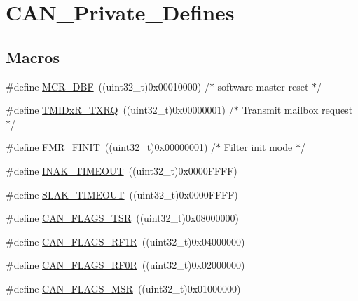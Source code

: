 \hypertarget{group___c_a_n___private___defines}{}\section{C\+A\+N\+\_\+\+Private\+\_\+\+Defines}
\label{group___c_a_n___private___defines}
\subsection*{Macros}
\begin{DoxyCompactItemize}
\item 
\#define \mbox{\hyperlink{group___c_a_n___private___defines_ga1ded3736beb63c49281f2983fc68c36d}{M\+C\+R\+\_\+\+D\+BF}}~((uint32\+\_\+t)0x00010000) /$\ast$ software master reset $\ast$/
\item 
\#define \mbox{\hyperlink{group___c_a_n___private___defines_gabeb6db5ba5c01da5084ec1605f868e18}{T\+M\+I\+Dx\+R\+\_\+\+T\+X\+RQ}}~((uint32\+\_\+t)0x00000001) /$\ast$ Transmit mailbox request $\ast$/
\item 
\#define \mbox{\hyperlink{group___c_a_n___private___defines_ga6125d0273c466e402db1a8f5bf888857}{F\+M\+R\+\_\+\+F\+I\+N\+IT}}~((uint32\+\_\+t)0x00000001) /$\ast$ Filter init mode $\ast$/
\item 
\#define \mbox{\hyperlink{group___c_a_n___private___defines_ga60a32132df242146efd3e9f7a079f0f0}{I\+N\+A\+K\+\_\+\+T\+I\+M\+E\+O\+UT}}~((uint32\+\_\+t)0x0000\+F\+F\+F\+F)
\item 
\#define \mbox{\hyperlink{group___c_a_n___private___defines_ga1bb8107706c8b4039ac55a122f3c65bb}{S\+L\+A\+K\+\_\+\+T\+I\+M\+E\+O\+UT}}~((uint32\+\_\+t)0x0000\+F\+F\+F\+F)
\item 
\#define \mbox{\hyperlink{group___c_a_n___private___defines_gac67e7d905ba11441bf9e14180805cf3a}{C\+A\+N\+\_\+\+F\+L\+A\+G\+S\+\_\+\+T\+SR}}~((uint32\+\_\+t)0x08000000)
\item 
\#define \mbox{\hyperlink{group___c_a_n___private___defines_ga2a03d73273ab353c8deb3a4730431977}{C\+A\+N\+\_\+\+F\+L\+A\+G\+S\+\_\+\+R\+F1R}}~((uint32\+\_\+t)0x04000000)
\item 
\#define \mbox{\hyperlink{group___c_a_n___private___defines_ga4b22b2552759778ac07825240823a45f}{C\+A\+N\+\_\+\+F\+L\+A\+G\+S\+\_\+\+R\+F0R}}~((uint32\+\_\+t)0x02000000)
\item 
\#define \mbox{\hyperlink{group___c_a_n___private___defines_ga3aaa7df395ce1a90cb6e2ff3d2c4b24e}{C\+A\+N\+\_\+\+F\+L\+A\+G\+S\+\_\+\+M\+SR}}~((uint32\+\_\+t)0x01000000)

\end{DoxyCompactItemize}
